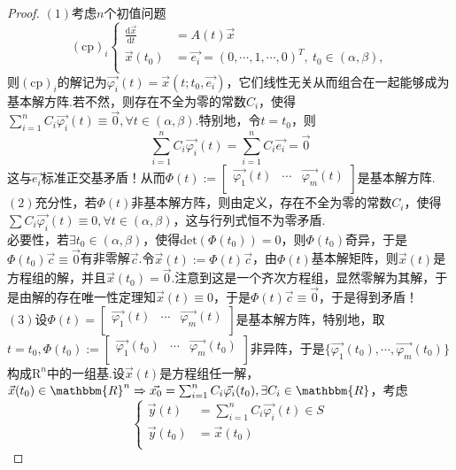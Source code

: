 \documentclass{ctexart}
\begin{document}
\begin{proof}
$(1)$考虑$n$个初值问题
$$(\mathrm{cp})_{i}\left\{\begin{aligned}\frac{\mathrm{d}\vec{x}}{\mathrm{d}t}&=A(t)\vec{x}\\ \vec{x}(t_{0})&=\vec{e_{i}}=(0,\cdots,1,\cdots,0)^{T},~t_{0}\in(\alpha,\beta),\\\end{aligned}\right.$$
则$(\mathrm{cp})_{i}$的解记为$\vec{\varphi_{i}}(t)=\vec{x}(t;t_{0},\vec{e_{i}})$，它们线性无关从而组合在一起能够成为基本解方阵.若不然，则存在不全为零的常数$C_{i}$，使得$\sum\limits_{i=1}^{n}{C_{i}\vec{\varphi_{i}}(t)}\equiv \vec{0},\forall t\in(\alpha,\beta)$.特别地，令$t=t_{0}$，则
$$\sum_{i=1}^{n}{C_{i}\vec{\varphi_{i}}(t)}=\sum_{i=1}^{n}{C_{i}\vec{e_{i}}}=\vec{0}$$
这与$\vec{e_{i}}$标准正交基矛盾！从而$\Phi(t):=\begin{bmatrix}\vec{\varphi_{1}}(t)&\cdots&\vec{\varphi_{m}}(t)\\\end{bmatrix}$是基本解方阵.\\
$(2)$充分性，若$\Phi(t)$非基本解方阵，则由定义，存在不全为零的常数$C_{i}$，使得$\sum{C_{i}\vec{\varphi_{i}}(t)}\equiv 0,\forall t\in(\alpha,\beta)$，这与行列式恒不为零矛盾.\\
必要性，若$\exists t_{0}\in(\alpha,\beta)$，使得$\mathrm{det}(\Phi(t_{0}))=0$，则$\Phi(t_{0})$奇异，于是$\Phi(t_{0})\vec{c}\equiv \vec{0}$有非零解$\vec{c}$.令$\vec{x}(t):=\Phi(t)\vec{c}$，由$\Phi(t)$基本解矩阵，则$\vec{x}(t)$是方程组的解，并且$\vec{x}(t_{0})=\vec{0}$.注意到这是一个齐次方程组，显然零解为其解，于是由解的存在唯一性定理知$\vec{x}(t)\equiv 0$，于是$\Phi(t)\vec{c}\equiv \vec{0}$，于是得到矛盾！\\
$(3)$设$\Phi(t)=\begin{bmatrix}\vec{\varphi_{1}}(t)&\cdots&\vec{\varphi_{m}}(t)\\\end{bmatrix}$是基本解方阵，特别地，取$t=t_{0},\Phi(t_{0}):=\begin{bmatrix}\vec{\varphi_{1}}(t_{0})&\cdots&\vec{\varphi_{m}}(t_{0})\\\end{bmatrix}$非异阵，于是$\{\vec{\varphi_{1}}(t_{0}),\cdots,\vec{\varphi_{m}}(t_{0})\}$构成$\mathrm{R}^{n}$中的一组基.设$\vec{x}(t)$是方程组任一解，$\vec{x}(t_{0})\in\mathbbm{R}^{n}\Rightarrow \vec{x_{0}}=\sum_{i=1}^{n}{C_{i}\vec{\varphi_{i}}(t_{0})},\exists C_{i}\in\mathbbm{R}$，考虑
$$\left\{\begin{aligned}\vec{y}(t)&=\sum_{i=1}^{n}{C_{i}\vec{\varphi_{i}}(t)}\in S\\ \vec{y}(t_{0})&=\vec{x}(t_{0})\\\end{aligned}\right.$$

\end{proof}
\end{document}

